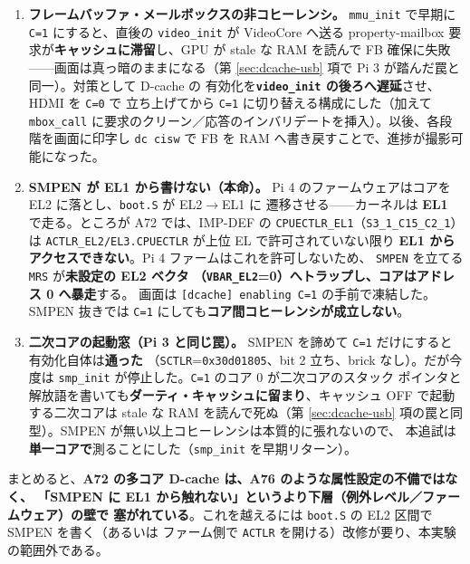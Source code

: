 \begin{enumerate}[leftmargin=1.6em]
  \item \textbf{フレームバッファ・メールボックスの非コヒーレンシ。}
        \texttt{mmu\_init} で早期に \texttt{C=1} にすると、直後の \texttt{video\_init}
        が VideoCore へ送る property-mailbox 要求が\textbf{キャッシュに滞留}し、GPU が
        stale な RAM を読んで FB 確保に失敗——画面は真っ暗のままになる（第
        \ref{sec:dcache-usb} 項で Pi 3 が踏んだ罠と同一）。対策として D-cache の
        有効化を\textbf{\texttt{video\_init} の後ろへ遅延}させ、HDMI を \texttt{C=0} で
        立ち上げてから \texttt{C=1} に切り替える構成にした（加えて \texttt{mbox\_call}
        に要求のクリーン／応答のインバリデートを挿入）。以後、各段階を画面に印字し
        \texttt{dc cisw} で FB を RAM へ書き戻すことで、進捗が撮影可能になった。

  \item \textbf{SMPEN が EL1 から書けない（本命）。}
        Pi 4 のファームウェアはコアを EL2 に落とし、\texttt{boot.S} が EL2$\to$EL1 に
        遷移させる——カーネルは \textbf{EL1} で走る。ところが A72 では、IMP-DEF の
        \texttt{CPUECTLR\_EL1}（\texttt{S3\_1\_C15\_C2\_1}）は
        \texttt{ACTLR\_EL2/EL3.CPUECTLR} が上位 EL で許可されていない限り
        \textbf{EL1 からアクセスできない}。Pi 4 ファームはこれを許可しないため、
        \texttt{SMPEN} を立てる \texttt{MRS} が\textbf{未設定の EL2 ベクタ
        （\texttt{VBAR\_EL2}=0）へトラップし、コアはアドレス 0 へ暴走}する。
        画面は \texttt{[dcache] enabling C=1} の手前で凍結した。SMPEN 抜きでは
        \texttt{C=1} にしても\textbf{コア間コヒーレンシが成立しない}。

  \item \textbf{二次コアの起動窓（Pi 3 と同じ罠）。}
        SMPEN を諦めて \texttt{C=1} だけにすると有効化自体は\textbf{通った}
        （\texttt{SCTLR}=\texttt{0x30d01805}、bit 2 立ち、brick なし）。だが今度は
        \texttt{smp\_init} が停止した。\texttt{C=1} のコア 0 が二次コアのスタック
        ポインタと解放語を書いても\textbf{ダーティ・キャッシュに留まり}、キャッシュ
        OFF で起動する二次コアは stale な RAM を読んで死ぬ（第 \ref{sec:dcache-usb}
        項の罠と同型）。SMPEN が無い以上コヒーレンシは本質的に張れないので、
        本追試は\textbf{単一コアで}測ることにした（\texttt{smp\_init} を早期リターン）。
\end{enumerate}

\noindent
まとめると、\textbf{A72 の多コア D-cache は、A76 のような属性設定の不備ではなく、
「SMPEN に EL1 から触れない」というより下層（例外レベル／ファームウェア）の壁で
塞がれている}。これを越えるには \texttt{boot.S} の EL2 区間で SMPEN を書く（あるいは
ファーム側で \texttt{ACTLR} を開ける）改修が要り、本実験の範囲外である。


